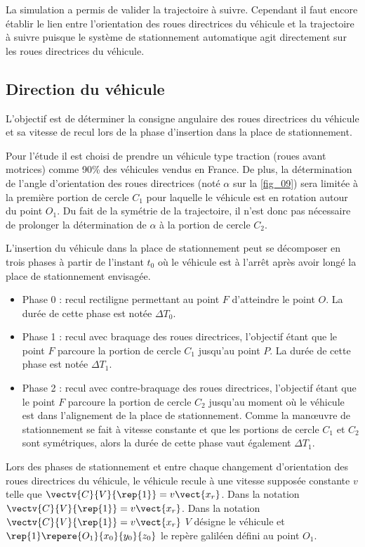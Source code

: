 La simulation a permis de valider la trajectoire à suivre. Cependant il faut encore établir le lien entre l’orientation
des roues directrices du véhicule et la trajectoire à suivre puisque le système de stationnement automatique agit
directement sur les roues directrices du véhicule.

\subsection{Direction du véhicule}

\begin{obj}
L’objectif est de déterminer la consigne angulaire des roues directrices du véhicule et sa vitesse de
recul lors de la phase d’insertion dans la place de stationnement.
\end{obj}


Pour l’étude il est choisi de prendre un véhicule type traction (roues avant motrices) comme 90\% des véhicules
vendus en France. De plus, la détermination de l’angle d’orientation des roues directrices (noté $\alpha$ sur la \autoref{fig_09})
sera limitée à la première portion de cercle $C_1$ pour laquelle le véhicule est en rotation autour du point $O_1$. Du
fait de la symétrie de la trajectoire, il n’est donc pas nécessaire de prolonger la détermination de $\alpha$ à la portion
de cercle $C_2$.

L’insertion du véhicule dans la place de stationnement peut se décomposer en trois phases à partir de l’instant
$t_0$ où le véhicule est à l’arrêt après avoir longé la place de stationnement envisagée.

\begin{itemize}
\item Phase 0 : recul rectiligne permettant au point $F$ d’atteindre le point $O$. La durée de cette phase est notée $\Delta T_0$.
\item Phase 1 : recul avec braquage des roues directrices, l’objectif étant que le point $F$ parcoure la portion de
cercle $C_1$ jusqu’au point $P$. La durée de cette phase est notée $\Delta T_1$.
\item Phase 2 : recul avec contre-braquage des roues directrices, l’objectif étant que le point $F$ parcoure la portion
de cercle $C_2$ jusqu’au moment où le véhicule est dans l’alignement de la place de stationnement. Comme la
manœuvre de stationnement se fait à vitesse constante et que les portions de cercle $C_1$
et $C_2$ sont symétriques, alors la durée de cette phase vaut également $\Delta T_1$.
\end{itemize}
Lors des phases de stationnement et entre chaque changement d’orientation des roues directrices du véhicule,
le véhicule recule à une vitesse supposée constante $v$ telle que $\vectv{C}{V}{\rep{1}}=v\vect{x_r}$. Dans la notation
$\vectv{C}{V}{\rep{1}}=v\vect{x_r}$. 
Dans la notation $\vectv{C}{V}{\rep{1}}=v\vect{x_r}$ $V$ désigne le véhicule et $\rep{1}\repere{O_1}{x_0}{y_0}{z_0}$
le repère galiléen défini au point $O_1$.

